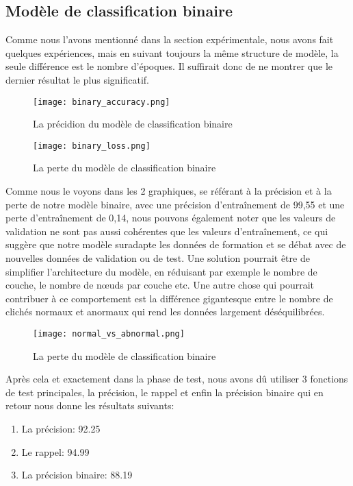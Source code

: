     \subsection{Modèle de classification binaire}
        Comme nous l'avons mentionné dans la section expérimentale, nous avons fait quelques expériences, mais en suivant toujours la même structure de modèle, la seule différence est le nombre d'époques. Il suffirait donc de ne montrer que le dernier résultat le plus significatif.
        \begin{figure}[H]
            \centering
            \texttt{[image: binary\_accuracy.png]}
            \caption{La précidion du modèle de classification binaire}\label{fig:binary_accuracy}
        \end{figure}
        \begin{figure}[H]
            \centering
            \texttt{[image: binary\_loss.png]}
            \caption{La perte du modèle de classification binaire}\label{fig:binary_loss}
        \end{figure}
        Comme nous le voyons dans les 2 graphiques, se référant à la précision et à la perte de notre modèle binaire, avec une précision d'entraînement de 99,55 et une perte d'entraînement de 0,14, nous pouvons également noter que les valeurs de validation ne sont pas aussi cohérentes que les valeurs d'entraînement, ce qui suggère que notre modèle suradapte les données de formation et se débat avec de nouvelles données de validation ou de test. Une solution pourrait être de simplifier l'architecture du modèle, en réduisant par exemple le nombre de couche, le nombre de nœuds par couche etc.
        Une autre chose qui pourrait contribuer à ce comportement est la différence gigantesque entre le nombre de clichés normaux et anormaux qui rend les données largement déséquilibrées.
        \begin{figure}[H]
            \centering
            \texttt{[image: normal\_vs\_abnormal.png]}
            \caption{La perte du modèle de classification binaire}\label{fig:normal_vs_abnormal}
        \end{figure}
        Après cela et exactement dans la phase de test, nous avons dû utiliser 3 fonctions de test principales, la précision, le rappel et enfin la précision binaire qui en retour nous donne les résultats suivants:
        \begin{enumerate}
            \item La précision: 92.25
            \item Le rappel: 94.99
            \item La précision binaire: 88.19
        \end{enumerate}
